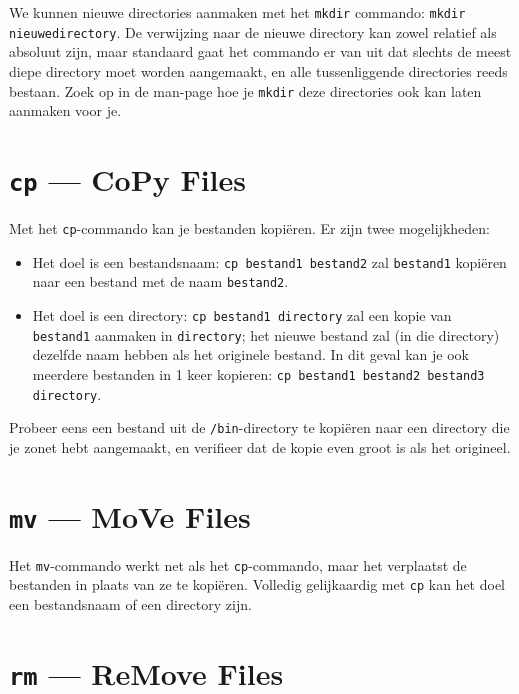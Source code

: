 \documentclass[a4paper,twoside,openany]{memoir}
\begin{document}
We kunnen nieuwe directories aanmaken met het \verb!mkdir! commando: \verb!mkdir nieuwedirectory!. De verwijzing naar de nieuwe directory kan zowel relatief als
absoluut zijn, maar standaard gaat het commando er van uit dat slechts de meest
diepe directory moet worden aangemaakt, en alle tussenliggende directories reeds
bestaan. Zoek op in de man-page hoe je \verb!mkdir! deze directories ook kan
laten aanmaken voor je.

\section{\texttt{cp} --- CoPy Files}

Met het \verb!cp!-commando kan je bestanden kopiëren. Er zijn twee mogelijkheden:

\begin{itemize}

  \item Het doel is een bestandsnaam: \verb!cp bestand1 bestand2! zal
    \verb!bestand1! kopiëren naar een bestand met de naam \verb!bestand2!.

  \item Het doel is een directory: \verb!cp bestand1 directory! zal een kopie
    van \verb!bestand1! aanmaken in \verb!directory!; het nieuwe bestand zal (in
    die directory) dezelfde naam hebben als het originele bestand. In dit geval
    kan je ook meerdere bestanden in 1 keer kopieren: \verb!cp bestand1 bestand2 bestand3 directory!.

\end{itemize}

Probeer eens een bestand uit de \verb!/bin!-directory te kopiëren naar een
directory die je zonet hebt aangemaakt, en verifieer dat de kopie even groot is
als het origineel.

\section{\texttt{mv} --- MoVe Files}

Het \verb!mv!-commando werkt net als het \verb!cp!-commando, maar het verplaatst
de bestanden in plaats van ze te kopiëren. Volledig gelijkaardig met \verb!cp!
kan het doel een bestandsnaam of een directory zijn.

\section{\texttt{rm} --- ReMove Files}
\end{document}
